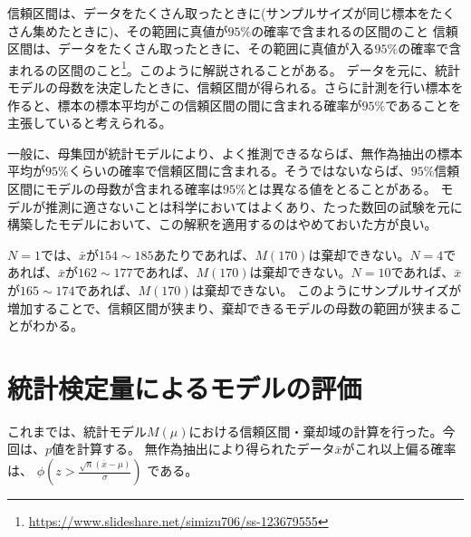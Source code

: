 \begin{SMbox}{信頼区間は、データをたくさん取ったときに(サンプルサイズが同じ標本をたくさん集めたときに)、その範囲に真値が$95\%$の確率で含まれるの区間のこと}
信頼区間は、データをたくさん取ったときに、その範囲に真値が入る$95\%$の確率で含まれるの区間のこと\footnote{\url{https://www.slideshare.net/simizu706/ss-123679555}}。このように解説されることがある。
データを元に、統計モデルの母数を決定したときに、信頼区間が得られる。さらに計測を行い標本を作ると、標本の標本平均がこの信頼区間の間に含まれる確率が$95\%$であることを主張していると考えられる。

一般に、母集団が統計モデルにより、よく推測できるならば、無作為抽出の標本平均が$95\%$くらいの確率で信頼区間に含まれる。そうではないならば、$95\%$信頼区間にモデルの母数が含まれる確率は$95\%$とは異なる値をとることがある。
モデルが推測に適さないことは科学においてはよくあり、たった数回の試験を元に構築したモデルにおいて、この解釈を適用するのはやめておいた方が良い。

\end{SMbox}




$N=1$では、$\bar{x}$が$154\sim185$あたりであれば、$M(170)$は棄却できない。$N=4$であれば、$\bar{x}$が$162\sim177$であれば、$M(170)$は棄却できない。$N=10$であれば、$\bar{x}$が$165\sim174$であれば、$M(170)$は棄却できない。
このようにサンプルサイズが増加することで、信頼区間が狭まり、棄却できるモデルの母数の範囲が狭まることがわかる。
\fi

\section{統計検定量によるモデルの評価}

これまでは、統計モデル$M(\mu)$における信頼区間・棄却域の計算を行った。今回は、$p$値を計算する。
無作為抽出により得られたデータ$\bar{x}$がこれ以上偏る確率は、
$\phi(z>\frac{\sqrt{n}(\bar{x}-\mu)}{\sigma})$
である。



